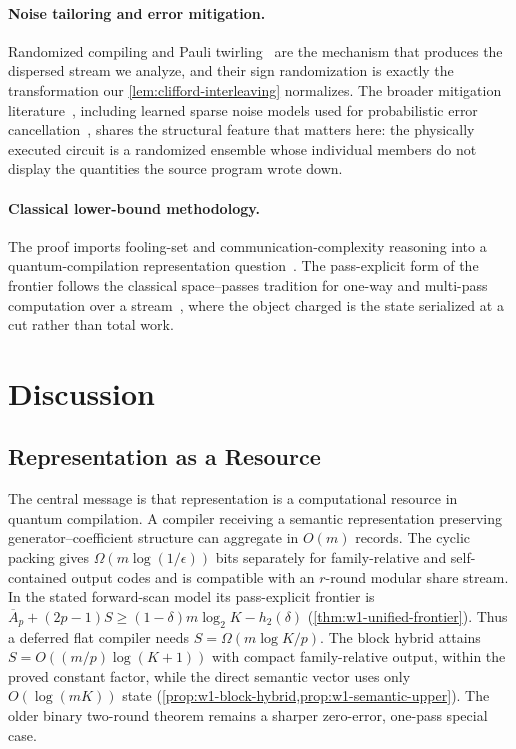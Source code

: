 \documentclass[aps,prx,reprint,floatfix,superscriptaddress]{revtex4-2}
\begin{document}
\paragraph{Noise tailoring and error mitigation.}
Randomized compiling and Pauli
twirling~\cite{wallman2016noise,hashim2021randomized,knill2005realistically}
are the mechanism that produces the dispersed stream we analyze, and
their sign randomization is exactly the transformation our
\cref{lem:clifford-interleaving} normalizes.  The broader mitigation
literature~\cite{cai2023mitigation}, including learned sparse noise
models used for probabilistic error
cancellation~\cite{vandenberg2023probabilistic}, shares the structural
feature that matters here: the physically executed circuit is a
randomized ensemble whose individual members do not display the
quantities the source program wrote down.

\paragraph{Classical lower-bound methodology.}
The proof imports fooling-set and communication-complexity reasoning into
a quantum-compilation representation
question~\cite{sipser2012introduction,kushilevitz1997communication,alur2010streaming}.
The pass-explicit form of the frontier follows the classical
space--passes tradition for one-way and multi-pass computation over a
stream~\cite{munro1980selection,alon1999space}, where the object charged
is the state serialized at a cut rather than total work.


\section{Discussion}
\label{sec:discussion}

\subsection{Representation as a Resource}

The central message is that representation is a computational resource in
quantum compilation. A compiler receiving a semantic representation
preserving generator--coefficient structure can aggregate in $O(m)$
records.  The cyclic packing gives
$\Omega(m\log(1/\epsilon))$ bits separately for family-relative and
self-contained output codes and is compatible with an $r$-round modular
share stream.  In the stated forward-scan model its pass-explicit frontier is
$\overline A_p+(2p-1)S\geq
(1-\delta)m\log_2K-h_2(\delta)$
(\cref{thm:w1-unified-frontier}).  Thus a deferred flat compiler needs
$S=\Omega(m\log K/p)$.  The block hybrid attains
$S=O((m/p)\log(K+1))$ with compact family-relative output, within the
proved constant factor, while the direct semantic vector uses only
$O(\log(mK))$ state
(\cref{prop:w1-block-hybrid,prop:w1-semantic-upper}).  The older binary
two-round theorem remains a sharper zero-error, one-pass special case.
\end{document}
